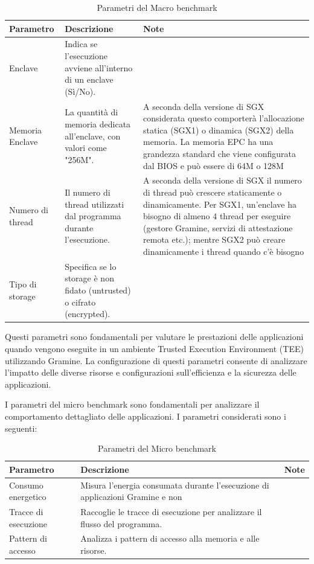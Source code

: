\documentclass{article}
\begin{document}
\begin{table}[h]
\centering
\begin{tabular}{|l|p{6cm}|p{6cm}|}
\hline
\textbf{Parametro} & \textbf{Descrizione} & \textbf{Note} \\ \hline
Enclave & Indica se l'esecuzione avviene all'interno di un enclave (Sì/No). & \\ \hline
Memoria Enclave & La quantità di memoria dedicata all'enclave, con valori come "256M". &  A seconda della versione di SGX considerata questo comporterà l'allocazione statica (SGX1) o dinamica (SGX2) della memoria. La memoria EPC ha una grandezza standard che viene configurata dal BIOS e può essere di 64M o 128M  \\ \hline
Numero di thread & Il numero di thread utilizzati dal programma durante l'esecuzione. & A seconda della versione di SGX il numero di thread può crescere staticamente o dinamicamente. Per SGX1, un'enclave ha bisogno di almeno $4$ thread per eseguire (gestore Gramine, servizi di attestazione remota etc.); mentre SGX2 può creare dinamicamente i thread quando c'è bisogno \\ \hline
Tipo di storage & Specifica se lo storage è non fidato (untrusted) o cifrato (encrypted). & \\ \hline
\end{tabular}
\caption{Parametri del Macro benchmark}
\end{table}

Questi parametri sono fondamentali per valutare le prestazioni delle applicazioni quando vengono eseguite in un ambiente Trusted Execution Environment (TEE) utilizzando Gramine. La configurazione di questi parametri consente di analizzare l'impatto delle diverse risorse e configurazioni sull'efficienza e la sicurezza delle applicazioni.

I parametri del micro benchmark sono fondamentali per analizzare il comportamento dettagliato delle applicazioni. I parametri considerati sono i seguenti:

\begin{table}[h]
\centering
\begin{tabular}{|l|p{6cm}|p{6cm}|}
\hline
\textbf{Parametro} & \textbf{Descrizione} & \textbf{Note} \\ \hline
Consumo energetico & Misura l'energia consumata durante l'esecuzione di applicazioni Gramine e non &  \\ \hline
Tracce di esecuzione & Raccoglie le tracce di esecuzione per analizzare il flusso del programma. &  \\ \hline
Pattern di accesso & Analizza i pattern di accesso alla memoria e alle risorse. &  \\ \hline
\end{tabular}
\caption{Parametri del Micro benchmark}
\end{table}
\end{document}
